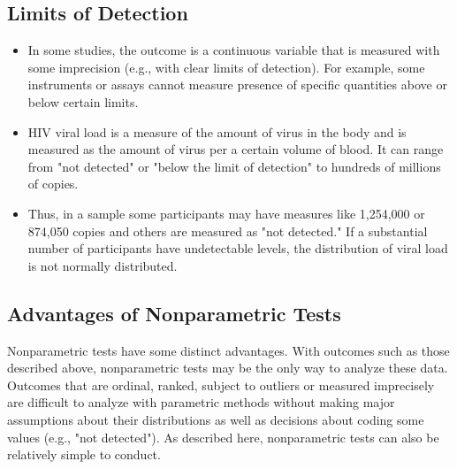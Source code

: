 \documentclass[12pt, a4paper]{report}
\theoremstyle{plain}
\theoremstyle{definition}
\theoremstyle{remark}
\begin{document}
\subsection*{Limits of Detection}
\begin{itemize}
\item In some studies, the outcome is a continuous variable that is measured with some imprecision (e.g., with clear limits of detection). For example, some instruments or assays cannot measure presence of specific quantities above or below certain limits. 
\item HIV viral load is a measure of the amount of virus in the body and is measured as the amount of virus per a certain volume of blood. It can range from "not detected" or "below the limit of detection" to hundreds of millions of copies. \item Thus, in a sample some participants may have measures like 1,254,000 or 874,050 copies and others are measured as "not detected." If a substantial number of participants have undetectable levels, the distribution of viral load is not normally distributed.
\end{itemize}


\subsection*{Advantages of Nonparametric Tests}

Nonparametric tests have some distinct advantages. With outcomes such as those described above, nonparametric tests may be the only way to analyze these data. Outcomes that are ordinal, ranked, subject to outliers or measured imprecisely are difficult to analyze with parametric methods without making major assumptions about their distributions as well as decisions about coding some values (e.g., "not detected"). As described here, nonparametric tests can also be relatively simple to conduct.


%
\end{document}
